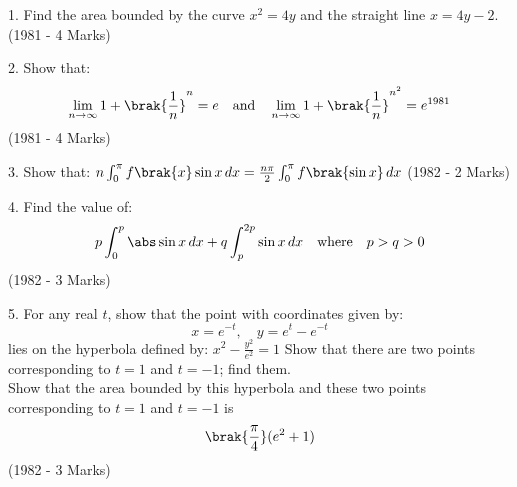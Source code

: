 \iffalse
  \title{Assignment}
  \author{AI2BTECH11008 - G.Sarvajith}
  \section{subjective}
\fi
\item 1. Find the area bounded by the curve $ x^2 = 4y $ and the straight line $ x = 4y - 2 $. \hfill (1981 - 4 Marks) \\
\item 2. Show that:
\begin{align*}
\lim_{n \to \infty} 1 +\brak{\frac{1}{n}}^n = e \quad \text{and} \quad \lim_{n \to \infty} 1 + \brak{\frac{1}{n}}^{n^2} = e^{1981}
\end{align*}
\hfill (1981 - 4 Marks) \\
\item 3. Show that:
$n \int_0^\pi f\brak{x} \sin x \, dx = \frac{n\pi}{2} \int_0^\pi f\brak{\sin x} \, dx$
\hfill (1982 - 2 Marks) \\
\item 4. Find the value of:
\begin{align*}
    p \int_0^p \abs \sin x \, dx + q \int_p^{2p} \sin x \, dx \quad \text{where} \quad p > q > 0
\end{align*}
\hfill (1982 - 3 Marks) \\
\item 5. For any real $ t $, show that the point with coordinates given by:
$$x = e^{-t}, \quad y = e^{t} - e^{-t}$$
lies on the hyperbola defined by:
$x^2 - \frac{y^2}{e^2} = 1$
Show that there are two points corresponding to  $t=1 $ and $ t=-1 $; find them.\\
Show that the area bounded by this hyperbola and these two points corresponding to $ t=1$ and $ t=-1 $ is \\
$$\brak{\frac{\pi}{4}}(e^2 + 1)$$
\hfill  (1982 - 3 Marks)
